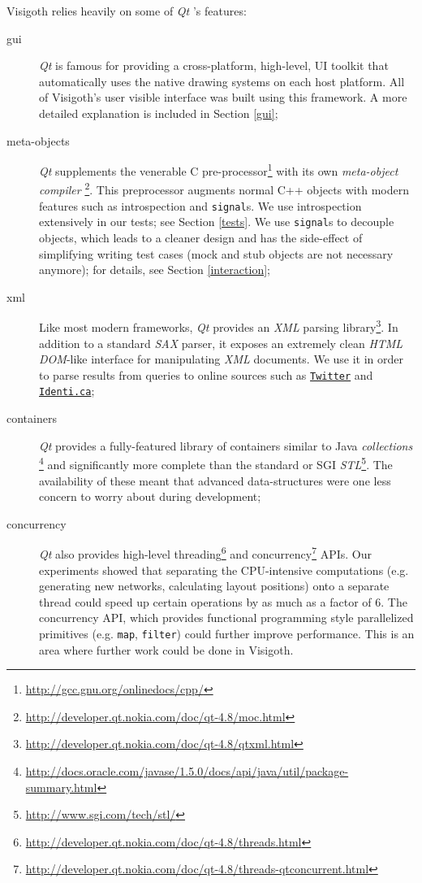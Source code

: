 \documentclass[a4paper,11pt,titlepage]{article}
\let\stdhref\href
\renewcommand{\href}[2]{\stdhref{#1}{\texttt{#2}}}
\newcommand{\code}[1]{\texttt{#1}}
\newcommand{\buzz}[1]{\emph{#1}}
\newcommand{\Qt}{\buzz{Qt} }
\newcommand{\Twitter}{\href{http://twitter.com}{Twitter} }
\begin{document}
Visigoth relies heavily on some of \Qt's features:
\begin{description}
\item [gui] \Qt is famous for providing a cross-platform, high-level,
  UI toolkit that automatically uses the native drawing systems on
  each host platform. All of Visigoth's user visible interface was
  built using this framework. A more detailed explanation is included
  in Section \ref{gui};
\item [meta-objects] \Qt supplements the venerable C
  pre-processor\footnote{\url{http://gcc.gnu.org/onlinedocs/cpp/}}
  with its own \buzz{meta-object
    compiler} \footnote{\url{http://developer.qt.nokia.com/doc/qt-4.8/moc.html}}.
  This preprocessor augments normal C++ objects with modern features
  such as introspection and \code{signal}s. We use introspection
  extensively in our tests; see Section \ref{tests}. We use
  \code{signal}s to decouple objects, which leads to a cleaner design
  and has the side-effect of simplifying writing test cases (mock and
  stub objects are not necessary anymore); for details, see Section
  \ref{interaction};
\item [xml] Like most modern frameworks, \Qt provides an \buzz{XML}
  parsing
  library\footnote{\url{http://developer.qt.nokia.com/doc/qt-4.8/qtxml.html}}.
  In addition to a standard \buzz{SAX} parser, it exposes an extremely
  clean \buzz{HTML DOM}-like interface for manipulating \buzz{XML}
  documents. We use it in order to parse results from queries to
  online sources such as \Twitter and
  \href{http://identi.ca}{Identi.ca};
\item [containers] \Qt provides a fully-featured library of containers
  similar to Java
  \buzz{collections} \footnote{\url{http://docs.oracle.com/javase/1.5.0/docs/api/java/util/package-summary.html}}
  and significantly more complete than the standard or SGI
  \buzz{STL}\footnote{\url{http://www.sgi.com/tech/stl/}}. The
  availability of these meant that advanced data-structures were one
  less concern to worry about during development;
\item [concurrency] \Qt also provides high-level
  threading\footnote{\url{http://developer.qt.nokia.com/doc/qt-4.8/threads.html}}
  and
  concurrency\footnote{\url{http://developer.qt.nokia.com/doc/qt-4.8/threads-qtconcurrent.html}}
  APIs. Our experiments showed that separating the CPU-intensive
  computations (e.g. generating new networks, calculating layout
  positions) onto a separate thread could speed up certain operations
  by as much as a factor of $6$. The concurrency API, which provides
  functional programming style parallelized primitives
  (e.g. \code{map}, \code{filter}) could further improve performance.
  This is an area where further work could be done in Visigoth.
\end{description}
\end{document}
